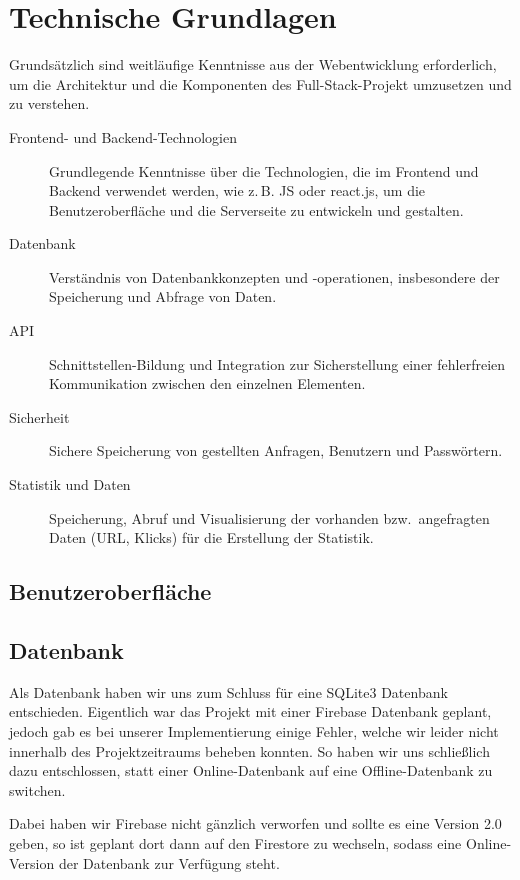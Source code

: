 \documentclass[a4paper,11pt,DIV=12,overfullrule=on]{scrreprt}%
\begin{document}
\chapter{Technische Grundlagen}
Grundsätzlich sind weitläufige Kenntnisse aus der Webentwicklung erforderlich, um die Architektur und die Komponenten des Full-Stack-Projekt umzusetzen und zu verstehen.

\begin{description}
    \item[Frontend- und Backend-Technologien] Grundlegende Kenntnisse über die Technologien, die im Frontend und Backend verwendet werden, wie z.\,B. \ac{JS} oder \mbox{react.js}, um die Benutzeroberfläche und die Serverseite zu entwickeln und gestalten.

    \item[Datenbank] Verständnis von Datenbankkonzepten und -operationen, insbesondere der Speicherung und Abfrage von Daten.

    \item[API] Schnittstellen-Bildung und Integration zur Sicherstellung einer fehlerfreien Kommunikation zwischen den einzelnen Elementen.

    \item[Sicherheit] Sichere Speicherung von gestellten Anfragen, Benutzern und Passwörtern.

    \item[Statistik und Daten] Speicherung, Abruf und Visualisierung der vorhanden bzw.\ angefragten Daten (\ac{URL}, Klicks) für die Erstellung der Statistik.
\end{description}

\section{Benutzeroberfläche}
\section{Datenbank}
Als Datenbank haben wir uns zum Schluss für eine SQLite3 Datenbank entschieden. Eigentlich war das Projekt mit einer Firebase Datenbank geplant, jedoch gab es bei unserer Implementierung einige Fehler, welche wir leider nicht innerhalb des Projektzeitraums beheben konnten. So haben wir uns schließlich dazu entschlossen, statt einer Online-Datenbank auf eine Offline-Datenbank zu switchen.

Dabei haben wir Firebase nicht gänzlich verworfen und sollte es eine Version 2.0 geben, so ist geplant dort dann auf den Firestore zu wechseln, sodass eine Online-Version der Datenbank zur Verfügung steht.
\end{document}
